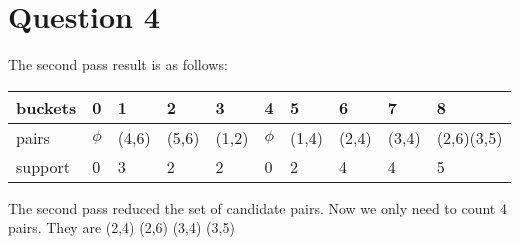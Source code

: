 \documentclass[paper=a4, fontsize=13pt]{article} %
\begin{document}
\section{Question 4}
The second pass result is as follows:\\
\begin{tabularx}{1\textwidth}{|X|X|X|X|X|X|X|X|X|X|}
\hline 
buckets & 0 & 1 & 2 & 3 & 4 & 5 & 6 & 7 & 8  \\ 
\hline 
pairs & $\phi$ & (4,6) & (5,6) & (1,2) & $\phi$ & (1,4) & (2,4) & (3,4) & (2,6)\newline(3,5) \\ 
\hline 
support & 0 & 3 & 2 & 2 & 0 & 2 & 4 & 4 & 5  \\ 
\hline
\end{tabularx} 
The second pass reduced the set of candidate pairs. Now we only need to count 4 pairs.
They are (2,4) (2,6) (3,4) (3,5)

\newpage
\end{document}

